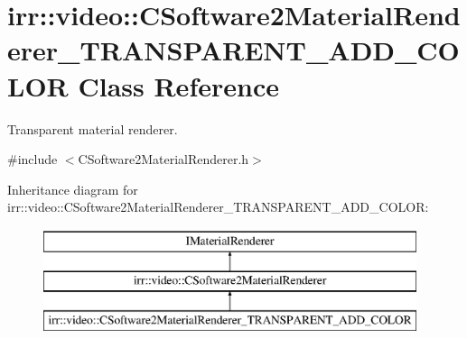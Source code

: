 \hypertarget{classirr_1_1video_1_1_c_software2_material_renderer___t_r_a_n_s_p_a_r_e_n_t___a_d_d___c_o_l_o_r}{\section{irr\-:\-:video\-:\-:C\-Software2\-Material\-Renderer\-\_\-\-T\-R\-A\-N\-S\-P\-A\-R\-E\-N\-T\-\_\-\-A\-D\-D\-\_\-\-C\-O\-L\-O\-R Class Reference}
\label{classirr_1_1video_1_1_c_software2_material_renderer___t_r_a_n_s_p_a_r_e_n_t___a_d_d___c_o_l_o_r}
}


Transparent material renderer.  




{\ttfamily \#include $<$C\-Software2\-Material\-Renderer.\-h$>$}

Inheritance diagram for irr\-:\-:video\-:\-:C\-Software2\-Material\-Renderer\-\_\-\-T\-R\-A\-N\-S\-P\-A\-R\-E\-N\-T\-\_\-\-A\-D\-D\-\_\-\-C\-O\-L\-O\-R\-:\begin{figure}[H]
\begin{center}
\leavevmode
\includegraphics[height=3.000000cm]{classirr_1_1video_1_1_c_software2_material_renderer___t_r_a_n_s_p_a_r_e_n_t___a_d_d___c_o_l_o_r}
\end{center}
\end{figure}
